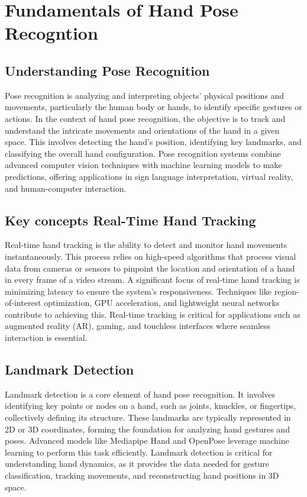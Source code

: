 \chapter{Fundamentals of Hand Pose Recogntion}

\section{Understanding Pose Recognition}
Pose recognition is analyzing and interpreting objects' physical positions and movements, particularly the human body or hands, to identify specific gestures or actions. In the context of hand pose recognition, the objective is to track and understand the intricate movements and orientations of the hand in a given space. This involves detecting the hand's position, identifying key landmarks, and classifying the overall hand configuration. Pose recognition systems combine advanced computer vision techniques with machine learning models to make predictions, offering applications in sign language interpretation, virtual reality, and human-computer interaction.
\section{Key concepts Real-Time Hand Tracking}
Real-time hand tracking is the ability to detect and monitor hand movements instantaneously. This process relies on high-speed algorithms that process visual data from cameras or sensors to pinpoint the location and orientation of a hand in every frame of a video stream. A significant focus of real-time hand tracking is minimizing latency to ensure the system's responsiveness. Techniques like region-of-interest optimization, GPU acceleration, and lightweight neural networks contribute to achieving this. Real-time tracking is critical for applications such as augmented reality (AR), gaming, and touchless interfaces where seamless interaction is essential.
\section{Landmark Detection}
Landmark detection is a core element of hand pose recognition. It involves identifying key points or nodes on a hand, such as joints, knuckles, or fingertips, collectively defining its structure. These landmarks are typically represented in 2D or 3D coordinates, forming the foundation for analyzing hand gestures and poses. Advanced models like Mediapipe Hand and OpenPose leverage machine learning to perform this task efficiently. Landmark detection is critical for understanding hand dynamics, as it provides the data needed for gesture classification, tracking movements, and reconstructing hand positions in 3D space.

